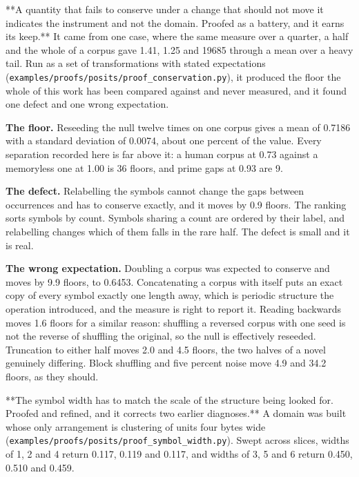 **A quantity that fails to conserve under a change that should not move it indicates the instrument and not the domain. Proofed as a battery, and it earns its keep.** It came from one case, where the same measure over a quarter, a half and the whole of a corpus gave 1.41, 1.25 and 19685 through a mean over a heavy tail. Run as a set of transformations with stated expectations (\texttt{examples/\allowbreak{}proofs/\allowbreak{}posits/\allowbreak{}proof\_\allowbreak{}conservation.\allowbreak{}py}), it produced the floor the whole of this work has been compared against and never measured, and it found one defect and one wrong expectation.

\textbf{The floor.} Reseeding the null twelve times on one corpus gives a mean of 0.7186 with a standard deviation of 0.0074, about one percent of the value. Every separation recorded here is far above it: a human corpus at 0.73 against a memoryless one at 1.00 is 36 floors, and prime gaps at 0.93 are 9.

\textbf{The defect.} Relabelling the symbols cannot change the gaps between occurrences and has to conserve exactly, and it moves by 0.9 floors. The ranking sorts symbols by count. Symbols sharing a count are ordered by their label, and relabelling changes which of them falls in the rare half. The defect is small and it is real.

\textbf{The wrong expectation.} Doubling a corpus was expected to conserve and moves by 9.9 floors, to 0.6453. Concatenating a corpus with itself puts an exact copy of every symbol exactly one length away, which is periodic structure the operation introduced, and the measure is right to report it. Reading backwards moves 1.6 floors for a similar reason: shuffling a reversed corpus with one seed is not the reverse of shuffling the original, so the null is effectively reseeded. Truncation to either half moves 2.0 and 4.5 floors, the two halves of a novel genuinely differing. Block shuffling and five percent noise move 4.9 and 34.2 floors, as they should.

**The symbol width has to match the scale of the structure being looked for. Proofed and refined, and it corrects two earlier diagnoses.** A domain was built whose only arrangement is clustering of units four bytes wide (\texttt{examples/\allowbreak{}proofs/\allowbreak{}posits/\allowbreak{}proof\_\allowbreak{}symbol\_\allowbreak{}width.\allowbreak{}py}). Swept across slices, widths of 1, 2 and 4 return 0.117, 0.119 and 0.117, and widths of 3, 5 and 6 return 0.450, 0.510 and 0.459.

